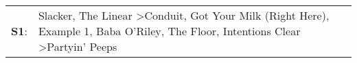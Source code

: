 \begin{supertabular}{p{0.03\textwidth}p{0.92\textwidth}}
 \textbf{S1}:  &  Slacker\textsuperscript{}, \enspace The Linear\textsuperscript{} \textgreater \enspace Conduit\textsuperscript{}, \enspace Got Your Milk (Right Here)\textsuperscript{}, \enspace Example 1\textsuperscript{}, \enspace Baba O'Riley\textsuperscript{}, \enspace The Floor\textsuperscript{}, \enspace Intentions Clear\textsuperscript{} \textgreater \enspace Partyin' Peeps\textsuperscript{}  \enspace  \\
\end{supertabular}
